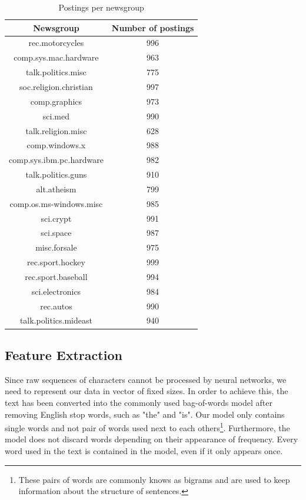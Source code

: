\documentclass[sigconf]{acmart}
\begin{document}
\begin{table}[]
	\centering
	\caption{Postings per newsgroup}
	\label{tab:groups}
	\begin{tabular}{c|c}
		\hline                      %
		Newsgroup & Number of postings \\ %
		\hline
		rec.motorcycles & 996 \\
		comp.sys.mac.hardware & 963 \\
		talk.politics.misc & 775 \\
		soc.religion.christian & 997 \\
		comp.graphics & 973 \\
		sci.med & 990 \\
		talk.religion.misc & 628 \\
		comp.windows.x & 988 \\
		comp.sys.ibm.pc.hardware & 982 \\
		talk.politics.guns & 910 \\
		alt.atheism & 799 \\
		comp.os.ms-windows.misc & 985 \\
		sci.crypt & 991 \\
		sci.space & 987 \\
		misc.forsale & 975 \\
		rec.sport.hockey & 999 \\
		rec.sport.baseball & 994 \\
		sci.electronics & 984 \\
		rec.autos & 990 \\
		talk.politics.mideast & 940
	\end{tabular}
\end{table}

\subsection{Feature Extraction}

Since raw sequences of characters cannot be processed by neural networks, we need to represent our data in vector of fixed sizes. In order to achieve this, the text has been converted into the commonly used bag-of-words model after removing English stop words, such as "the" and "is". Our model only contains single words and not pair of words used next to each others\footnote{These pairs of words are commonly knows as bigrams and are used to keep information about the structure of sentences.}. Furthermore, the model does not discard words depending on their appearance of frequency. Every word used in the text is contained in the model, even if it only appears once.
\end{document}
